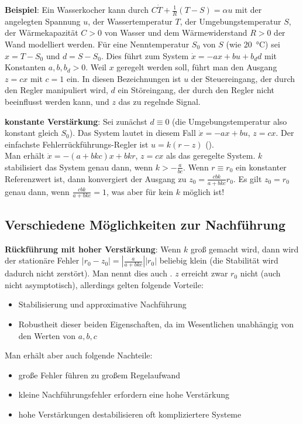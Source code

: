\textbf{Beispiel}:
Ein Wasserkocher kann durch $C\dot{T} + \frac{1}{R} (T - S) = \alpha u$ mit
der angelegten Spannung $u$,
der Wassertemperatur $T$,
der Umgebungstemperatur $S$,
der Wärmekapazität $C > 0$ von Wasser und
dem Wärmewiderstand $R > 0$ der Wand modelliert werden.
Für eine Nenntemperatur $S_0$ von $S$ (wie \SI{20}{\celsius}) sei $x = T - S_0$ und $d = S - S_0$.
Dies führt zum System $\dot{x} = -ax + bu + b_d d$ mit Konstanten $a, b, b_d > 0$.
Weil $x$ geregelt werden soll, führt man den Ausgang $z = cx$ mit $c = 1$ ein.
In diesen Bezeichnungen ist
$u$ der Steuereingang, der durch den Regler manipuliert wird,
$d$ ein Störeingang, der durch den Regler nicht beeinflusst werden kann, und
$z$ das zu regelnde Signal.

\textbf{konstante Verstärkung}:
Sei zunächst $d \equiv 0$ (die Umgebungstemperatur also konstant gleich $S_0$).
Das System lautet in diesem Fall $\dot{x} = -ax + bu$, $z = cx$.
Der einfachste Fehlerrückführungs-Regler ist $u = k(r - z)$
().\\
Man erhält $\dot{x} = -(a + bkc)x + bkr$, $z = cx$ als das geregelte System.
$k$ stabilisiert das System genau dann, wenn $k > -\frac{a}{bc}$.
Wenn $r \equiv r_0$ ein konstanter Referenzwert ist, dann konvergiert der Ausgang zu
$z_0 = \frac{cbk}{a + bkc} r_0$.
Es gilt $z_0 = r_0$ genau dann, wenn $\frac{cbk}{a + bkc} = 1$, was aber für kein $k$ möglich ist!

\pagebreak

\subsection{%
    Verschiedene Möglichkeiten zur Nachführung%
}

\textbf{Rückführung mit hoher Verstärkung}:
Wenn $k$ groß gemacht wird, dann wird der stationäre Fehler
$|r_0 - z_0| = \left|\frac{a}{a + bkc}\right| |r_0|$ beliebig klein
(die Stabilität wird dadurch nicht zerstört).
Man nennt dies auch .
$z$ erreicht zwar $r_0$ nicht (auch nicht asymptotisch), allerdings gelten folgende Vorteile:
\begin{itemize}
    \item
    Stabilisierung und approximative Nachführung
    
    \item
    Robustheit dieser beiden Eigenschaften, da im Wesentlichen unabhängig von den Werten von
    $a, b, c$
\end{itemize}
Man erhält aber auch folgende Nachteile:
\begin{itemize}
    \item
    große Fehler führen zu großem Regelaufwand
    
    \item
    kleine Nachführungsfehler erfordern eine hohe Verstärkung
    
    \item
    hohe Verstärkungen destabilisieren oft kompliziertere Systeme
\end{itemize}

